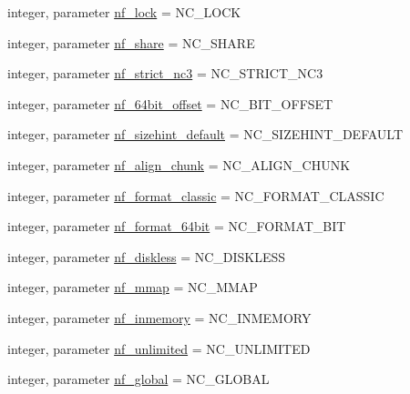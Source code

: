 \begin{DoxyCompactItemize}
\item 
integer, parameter \hyperlink{namespacenetcdf__nf__data_aa22cfb535bd1e4b604b4611112df9db9}{nf\+\_\+lock} = N\+C\+\_\+\+L\+O\+CK
\item 
integer, parameter \hyperlink{namespacenetcdf__nf__data_a2670fde546ed052a821c507ed5beef88}{nf\+\_\+share} = N\+C\+\_\+\+S\+H\+A\+RE
\item 
integer, parameter \hyperlink{namespacenetcdf__nf__data_a06091f799fafc66bce2118228c404f14}{nf\+\_\+strict\+\_\+nc3} = N\+C\+\_\+\+S\+T\+R\+I\+C\+T\+\_\+\+N\+C3
\item 
integer, parameter \hyperlink{namespacenetcdf__nf__data_a6245127b1df81b4bc56f354a0b982950}{nf\+\_\+64bit\+\_\+offset} = N\+C\+\_\+B\+I\+T\+\_\+\+O\+F\+F\+S\+ET
\item 
integer, parameter \hyperlink{namespacenetcdf__nf__data_a7b4a147f447c929c8e420751c575a4e8}{nf\+\_\+sizehint\+\_\+default} = N\+C\+\_\+\+S\+I\+Z\+E\+H\+I\+N\+T\+\_\+\+D\+E\+F\+A\+U\+LT
\item 
integer, parameter \hyperlink{namespacenetcdf__nf__data_a3220c3336396ea4bb888b530dc5aa009}{nf\+\_\+align\+\_\+chunk} = N\+C\+\_\+\+A\+L\+I\+G\+N\+\_\+\+C\+H\+U\+NK
\item 
integer, parameter \hyperlink{namespacenetcdf__nf__data_a449d876734b1500d1735d797718432ed}{nf\+\_\+format\+\_\+classic} = N\+C\+\_\+\+F\+O\+R\+M\+A\+T\+\_\+\+C\+L\+A\+S\+S\+IC
\item 
integer, parameter \hyperlink{namespacenetcdf__nf__data_aab99eafbfed8bb22a4e07b300eec8ffe}{nf\+\_\+format\+\_\+64bit} = N\+C\+\_\+\+F\+O\+R\+M\+A\+T\+\_\+B\+IT
\item 
integer, parameter \hyperlink{namespacenetcdf__nf__data_a0c93b5fc2e40ce8d75e94f1ad2638b80}{nf\+\_\+diskless} = N\+C\+\_\+\+D\+I\+S\+K\+L\+E\+SS
\item 
integer, parameter \hyperlink{namespacenetcdf__nf__data_a7a6fa120e092e81460a00d740d306edf}{nf\+\_\+mmap} = N\+C\+\_\+\+M\+M\+AP
\item 
integer, parameter \hyperlink{namespacenetcdf__nf__data_ae1df4cb46d9c0b94386f1c6a32d57b76}{nf\+\_\+inmemory} = N\+C\+\_\+\+I\+N\+M\+E\+M\+O\+RY
\item 
integer, parameter \hyperlink{namespacenetcdf__nf__data_a4897b8e7d6863dc359b217d9a1826167}{nf\+\_\+unlimited} = N\+C\+\_\+\+U\+N\+L\+I\+M\+I\+T\+ED
\item 
integer, parameter \hyperlink{namespacenetcdf__nf__data_a8762f96827f890e2c127c2e2fbfae8cd}{nf\+\_\+global} = N\+C\+\_\+\+G\+L\+O\+B\+AL
\item 

\end{DoxyCompactItemize}
